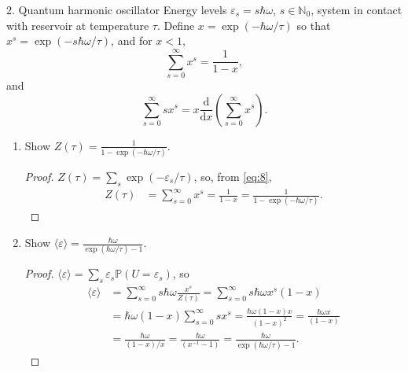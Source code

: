 \documentclass[11pt]{article}
\begin{document}
\begin{problem}{2. Quantum harmonic oscillator}
  Energy levels \(\varepsilon_s = s\hbar \omega\), \( s \in \mathbb{N}_0 \), system in contact with reservoir at temperature \(\tau\).
  Define \( x = \exp(-\hbar\omega/\tau) \) so that \( x^s = \exp(-s\hbar\omega/\tau) \), and for \( x < 1 \),
  \begin{equation}
  \label{eq:8}
  \sum\limits_{s=0}^{\infty} x^s = \frac{1}{1-x},
\end{equation}
and
\begin{equation}
\label{eq:9}
\sum\limits_{s = 0}^{\infty} sx^s = x \frac{\mathrm{d} }{\mathrm{d} x}\left( \sum\limits_{s=0}^{\infty} x^s \right).
\end{equation}
\begin{enumerate}[label=(\alph*)]
  \item Show \( Z(\tau) = \frac{1}{1-\exp(-\hbar\omega/\tau)} \).
        \begin{proof}
          \( Z(\tau) = \sum\limits_s \exp(-\varepsilon_s/\tau) \), so, from \cref{eq:8},
          \begin{equation}
          \label{eq:10}
          \begin{aligned}
            Z(\tau) &= \sum\limits_{s=0}^{\infty} x^{s} = \frac{1}{1-x} = \frac{1}{1- \exp(-\hbar\omega/\tau)}.
          \end{aligned}
          \end{equation}
        \end{proof}
  \item Show \(\langle\varepsilon\rangle = \frac{\hbar\omega}{\exp(\hbar\omega/\tau) - 1}\).
        \begin{proof}
          \( \langle\varepsilon\rangle = \sum\limits_s \varepsilon_s \mathbb{P}(U=\varepsilon_s) \), so
          \begin{equation}
          \label{eq:11}
          \begin{aligned}
            \langle\varepsilon\rangle &= \sum\limits_{s=0}^{\infty} s\hbar\omega \frac{x^{s}}{Z(\tau)} = \sum\limits_{s=0}^{\infty} s\hbar\omega x^s(1-x) \\
                &= \hbar\omega(1-x) \sum\limits_{s=0}^{\infty} sx^s = \frac{\hbar\omega(1-x)x}{(1-x)^2} = \frac{\hbar\omega x}{(1-x)} \\
            &= \frac{\hbar\omega}{(1-x)/x} = \frac{\hbar\omega}{(x^{-1} - 1)} = \frac{\hbar\omega}{\exp(\hbar\omega/\tau) - 1}.
          \end{aligned}
          \end{equation}

\end{proof}
\end{enumerate}
\end{problem}
\end{document}

